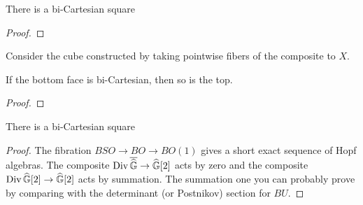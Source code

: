 \begin{theorem}
There is a bi-Cartesian square
\begin{center}
\end{center}
\end{theorem}
\begin{proof}
\end{proof}

\begin{lemma}
Consider the cube constructed by taking pointwise fibers of the composite to $X$.
\begin{center}
\end{center}
If the bottom face is bi-Cartesian, then so is the top.
\end{lemma}
\begin{proof}
\end{proof}

\begin{corollary}
There is a bi-Cartesian square
\begin{center}
\end{center}
\end{corollary}
\begin{proof}
The fibration $BSO \to BO \to BO(1)$ gives a short exact sequence of Hopf algebras.  The composite $\operatorname{Div} \overline{\widehat{\mathbb G}} \to \widehat{\mathbb G}[2]$ acts by zero and the composite $\operatorname{Div} \widehat{\mathbb G}[2] \to \widehat{\mathbb G}[2]$ acts by summation.  The summation one you can probably prove by comparing with the determinant (or Postnikov) section for $BU$.
\end{proof}

